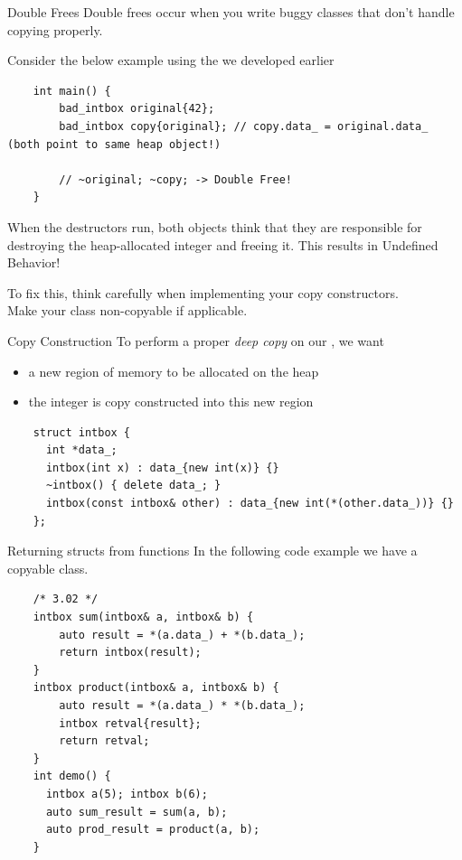 \begin{frame}[fragile]{Double Frees}
  Double frees occur when you write buggy classes that don't handle copying properly.

  Consider the below example using the  we developed earlier
  \begin{verbatim}
    int main() {
        bad_intbox original{42};
        bad_intbox copy{original}; // copy.data_ = original.data_ (both point to same heap object!)
    
        // ~original; ~copy; -> Double Free!
    }
  \end{verbatim}
  When the destructors run, both objects think that they are responsible for destroying
  the heap-allocated integer and freeing it. This results in Undefined Behavior!
  
  To fix this, think carefully when implementing your copy constructors.\\
  Make your class non-copyable if applicable.
\end{frame}

\begin{frame}[fragile]{Copy Construction}
  To perform a proper \emph{deep copy} on our , we want
  \begin{itemize}
    \item a new region of memory to be allocated on the heap
    \item the  integer is copy constructed into this new region
  \end{itemize}

  \begin{verbatim}
    struct intbox {
      int *data_;
      intbox(int x) : data_{new int(x)} {}
      ~intbox() { delete data_; }
      intbox(const intbox& other) : data_{new int(*(other.data_))} {}
    };
  \end{verbatim}
\end{frame}

\begin{frame}[fragile]{Returning structs from functions}
  In the following code example we have a copyable  class.\\

  \begin{verbatim}
    /* 3.02 */
    intbox sum(intbox& a, intbox& b) {
        auto result = *(a.data_) + *(b.data_);
        return intbox(result);
    }
    intbox product(intbox& a, intbox& b) {
        auto result = *(a.data_) * *(b.data_);
        intbox retval{result};
        return retval;
    }
    int demo() {
      intbox a(5); intbox b(6);
      auto sum_result = sum(a, b);
      auto prod_result = product(a, b);
    }
  \end{verbatim}
\end{frame}

